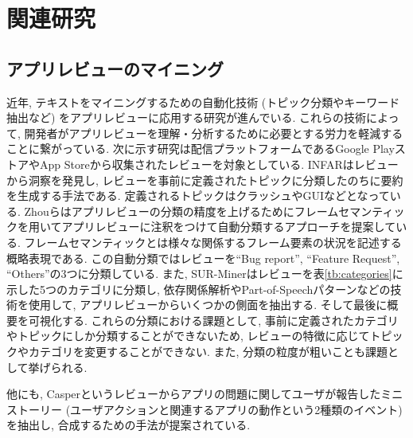 \chapter{関連研究}
\label{chap:kanrenkenkyuu}





\section{アプリレビューのマイニング}
近年, テキストをマイニングするための自動化技術 (トピック分類やキーワード抽出など)  をアプリレビューに応用する研究が進んでいる. これらの技術によって, 開発者がアプリレビューを理解・分析するために必要とする労力を軽減することに繋がっている. 
次に示す研究は配信プラットフォームであるGoogle PlayストアやApp Storeから収集されたレビューを対象としている. 
INFAR\cite{infar}はレビューから洞察を発見し, レビューを事前に定義されたトピックに分類したのちに要約を生成する手法である. 定義されるトピックはクラッシュやGUIなどとなっている. 
Zhouら\cite{dsa}はアプリレビューの分類の精度を上げるためにフレームセマンティックを用いてアプリレビューに注釈をつけて自動分類するアプローチを提案している. フレームセマンティックとは様々な関係するフレーム要素の状況を記述する概略表現である. この自動分類ではレビューを``Bug report'', ``Feature Request'', ``Others''の3つに分類している. 
また, SUR-Miner\cite{sur-miner}はレビューを表\ref{tb:categories}に示した5つのカテゴリに分類し, 依存関係解析やPart-of-Speechパターンなどの技術を使用して, アプリレビューからいくつかの側面を抽出する. そして最後に概要を可視化する. 
これらの分類における課題として, 事前に定義されたカテゴリやトピックにしか分類することができないため, レビューの特徴に応じてトピックやカテゴリを変更することができない. また, 分類の粒度が粗いことも課題として挙げられる. 

他にも, Casper\cite{caspar}というレビューからアプリの問題に関してユーザが報告したミニストーリー (ユーザアクションと関連するアプリの動作という2種類のイベント)  を抽出し, 合成するための手法が提案されている. 

